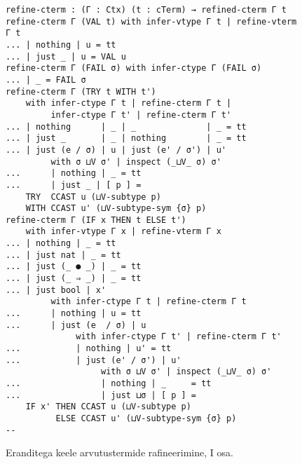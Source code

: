 \documentclass[a4paper,12pt]{article}
\begin{document}
\begin{figure}
  \begin{BVerbatim}
refine-cterm : (Γ : Ctx) (t : cTerm) → refined-cterm Γ t
refine-cterm Γ (VAL t) with infer-vtype Γ t | refine-vterm Γ t
... | nothing | u = tt
... | just _ | u = VAL u
refine-cterm Γ (FAIL σ) with infer-ctype Γ (FAIL σ)
... | _ = FAIL σ
refine-cterm Γ (TRY t WITH t')
    with infer-ctype Γ t | refine-cterm Γ t |
         infer-ctype Γ t' | refine-cterm Γ t'
... | nothing      | _ | _              | _ = tt
... | just _       | _ | nothing        | _ = tt
... | just (e / σ) | u | just (e' / σ') | u'
         with σ ⊔V σ' | inspect (_⊔V_ σ) σ'
...      | nothing | _ = tt
...      | just _ | [ p ] =
    TRY  CCAST u (⊔V-subtype p)
    WITH CCAST u' (⊔V-subtype-sym {σ} p)
refine-cterm Γ (IF x THEN t ELSE t')
    with infer-vtype Γ x | refine-vterm Γ x
... | nothing | _ = tt
... | just nat | _ = tt
... | just (_ ● _) | _ = tt
... | just (_ ⇒ _) | _ = tt
... | just bool | x'
         with infer-ctype Γ t | refine-cterm Γ t
...      | nothing | u = tt
...      | just (e  / σ) | u
              with infer-ctype Γ t' | refine-cterm Γ t'
...           | nothing | u' = tt
...           | just (e' / σ') | u'
                   with σ ⊔V σ' | inspect (_⊔V_ σ) σ'
...                | nothing | _     = tt
...                | just ⊔σ | [ p ] =
    IF x' THEN CCAST u (⊔V-subtype p)
          ELSE CCAST u' (⊔V-subtype-sym {σ} p)
--
  \end{BVerbatim}
  \caption{Eranditega keele arvutustermide rafineerimine, I osa.}
  \label{fig:exc.refine-cterm1}
\end{figure}
\end{document}
